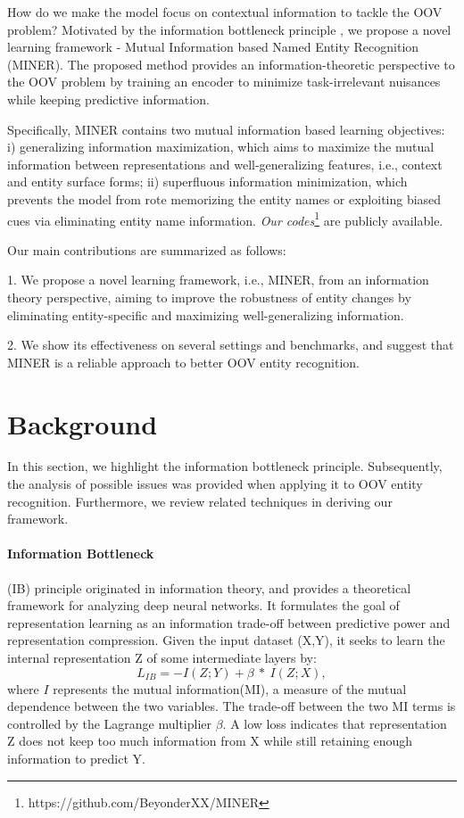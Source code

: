 \documentclass[11pt]{article}
\begin{document}
How do we make the model focus on contextual information to tackle the OOV problem? Motivated by the information bottleneck principle \cite{tishby2000information}, we propose a novel learning framework - Mutual Information based Named Entity Recognition (MINER). The proposed method provides an information-theoretic perspective to the OOV problem by training an encoder to minimize task-irrelevant nuisances while keeping predictive information.


Specifically, MINER contains two mutual information based learning objectives: i) generalizing information maximization, which aims to maximize the mutual information between representations and well-generalizing features, i.e., context and entity surface forms; ii) superfluous information minimization, which prevents the model from rote memorizing the entity names or exploiting biased cues via eliminating entity name information. \textit{Our codes}\footnote{https://github.com/BeyonderXX/MINER} are publicly available.
 

Our main contributions are summarized as follows:

1. We propose a novel learning framework, i.e., MINER, from an information theory perspective, aiming to improve the robustness of entity changes by eliminating entity-specific and maximizing well-generalizing information.

2. We show its effectiveness on several settings and benchmarks, and suggest that MINER is a reliable approach to better OOV entity recognition.

\section{Background}
In this section, we highlight the information bottleneck principle. Subsequently, the analysis of possible issues was provided when applying it to OOV entity recognition. Furthermore, we review related techniques in deriving our framework.

\paragraph{Information Bottleneck}(IB) principle originated in information theory, and provides a theoretical framework for analyzing deep neural networks.  It formulates the goal of representation learning as an information trade-off between predictive power and representation compression. Given the input dataset (X,Y), it seeks to learn the internal representation Z of some intermediate layers by:
$$
L_{IB} = -I(Z;Y) + \beta\ *\ I(Z;X),
$$
where $I$ represents the mutual information(MI), a measure of the mutual dependence between the two variables. The trade-off between the two MI terms is controlled by the Lagrange multiplier $\beta$. A low loss indicates that representation Z does not keep too much information from X while still retaining enough information to predict Y.
\end{document}
